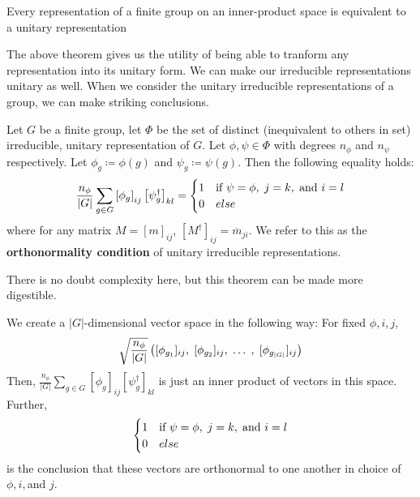 \documentclass[compress,aspectratio=169,10pt,usenames,dvipsnames]{beamer}
\begin{document}
\begin{frame}
\vfill
\begin{theorem}
	Every representation of a finite group on an inner-product space is equivalent to a unitary representation
\end{theorem}
\vfill
The above theorem gives us the utility of being able to tranform any representation into its unitary form. We can make our irreducible representations unitary as well.
\vfill
When we consider the unitary irreducible representations of a group, we can make striking conclusions.
\end{frame}
%
%
\begin{frame}
\vfill
\begin{theorem}
	Let $G$ be a finite group, let $\Phi$ be the set of distinct (inequivalent to others in set) irreducible, unitary representation of $G$. Let $\phi,\psi \in \Phi$ with degrees $n_{\phi}$ and $n_{\psi}$ respectively. Let $\phi_g \coloneq \phi(g)$ and $\psi_g \coloneq \psi(g)$. Then the following equality holds:
$$\frac{n_\phi}{|G|} \sum_{g\in G} \left[\phi_g \right]_{ij} \left[\psi_g^\dag \right]_{kl} = \begin{cases}
																						1 & \text{if } \psi = \phi,\hspace{1mm} j=k,\hspace{1mm} \text{and } i=l\\
																						0 & else
																					 \end{cases}$$
where for any matrix $M=\left[m\right]_{ij}$, $\left[M^\dag\right]_{ij} = \overline{m}_{ji} $. We refer to this as the \textbf{orthonormality condition} of unitary irreducible representations.
\end{theorem}
\vfill
There is no doubt complexity here, but this theorem can be made more digestible.
\vfill
\end{frame}
%
%
\begin{frame}
\vfill
We create a $|G|$-dimensional vector space in the following way: For fixed $\phi,i,j$,
$$\sqrt{\frac{n_\phi}{|G|}}\left([\phi_{g_1}]_{ij},\hspace{1mm} [\phi_{g_2}]_{ij}, \hspace{1mm}\hdots \hspace{1mm},\hspace{1mm} [\phi_{g_{|G|}}]_{ij}\right)$$
\vfill
Then, $\frac{n_\phi}{|G|} \sum_{g\in G} \left[\phi_g \right]_{ij} \left[\psi_g^\dag \right]_{kl}$ is just an inner product of vectors in this space. 
\vfill
Further,
$$\begin{cases}
																						1 & \text{if } \psi = \phi,\hspace{1mm} j=k,\hspace{1mm} \text{and } i=l\\
																						0 & else
																					 \end{cases}$$ is the conclusion that these vectors are orthonormal to one another in choice of $\phi,i,$and $j$.
\vfill
\end{frame}
\end{document}
